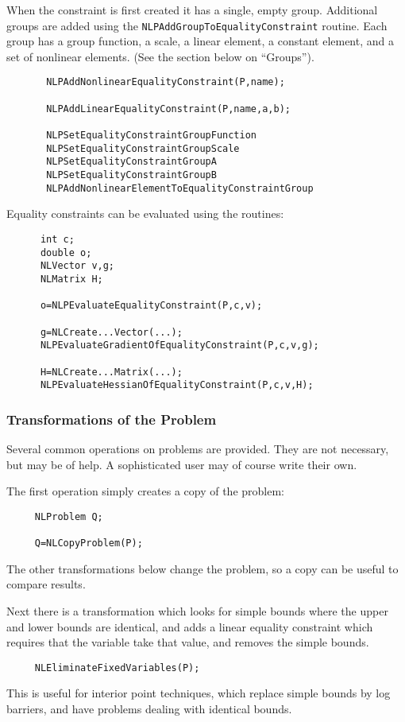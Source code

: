 \documentclass[12pt]{article}
\begin{document}
     When the constraint is first created it has a single, empty group. Additional groups are added using the
     {\tt NLPAdd\-Group\-To\-Equality\-Constraint} routine. Each group has a group function, a scale, a linear element,
     a constant element, and a set of nonlinear elements. (See the section below on ``Groups'').
     \begin{verbatim}
       NLPAddNonlinearEqualityConstraint(P,name);

       NLPAddLinearEqualityConstraint(P,name,a,b);

       NLPSetEqualityConstraintGroupFunction
       NLPSetEqualityConstraintGroupScale
       NLPSetEqualityConstraintGroupA
       NLPSetEqualityConstraintGroupB
       NLPAddNonlinearElementToEqualityConstraintGroup
     \end{verbatim}

     Equality constraints can be evaluated using the routines:
     \begin{verbatim}
      int c;
      double o;
      NLVector v,g;
      NLMatrix H;

      o=NLPEvaluateEqualityConstraint(P,c,v);

      g=NLCreate...Vector(...);
      NLPEvaluateGradientOfEqualityConstraint(P,c,v,g);

      H=NLCreate...Matrix(...);
      NLPEvaluateHessianOfEqualityConstraint(P,c,v,H);
     \end{verbatim}

   \subsubsection{Transformations of the Problem}

    Several common operations on problems are provided. They are not necessary, but may be of help. A sophisticated 
    user may of course write their own.

    The first operation simply creates a copy of the problem:
    \begin{verbatim}
     NLProblem Q;

     Q=NLCopyProblem(P);
    \end{verbatim}
    The other transformations below change the problem, so a copy can be useful to compare results.

    Next there is a transformation which looks for simple bounds where the upper and lower bounds are
    identical, and adds a linear equality constraint which requires that the variable take that value, 
    and removes the simple bounds.
    \begin{verbatim}
     NLEliminateFixedVariables(P);
    \end{verbatim}
    This is useful for interior point techniques, which replace simple bounds by log barriers, and have
    problems dealing with identical bounds.
\end{document}

